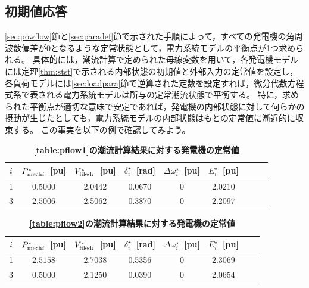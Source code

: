 \documentclass[tombow,dvipdfmx]{corona-a5-1.1}
\begin{document}
\subsection{初期値応答}

\ref{sec:powflow}節と\ref{sec:paradef}節で示された手順によって，すべての発電機の角周波数偏差が0となるような定常状態として，電力系統モデルの平衡点が1つ求められる。
具体的には，潮流計算で定められた母線変数を用いて，各発電機モデルには定理\ref{thm:stst}で示される内部状態の初期値と外部入力の定常値を設定し，各負荷モデルには\ref{sec:loadpara}節で逆算された定数を設定すれば，微分代数方程式系で表される電力系統モデルは所与の定常潮流状態で平衡する。
特に，求められた平衡点が適切な意味で安定であれば，発電機の内部状態に対して何らかの摂動が生じたとしても，電力系統モデルの内部状態はもとの定常値に漸近的に収束する。
この事実を以下の例で確認してみよう。


\begin{table}[h]
\medskip
 \caption{\textbf{\ref{table:pflow1}の潮流計算結果に対する発電機の定常値}}
 \label{table:genst13a}
 \centering
  \begin{tabular}{ccccccccc}
   \hline
$i$ &  $P_{{\rm mech}i}^{\star}$~[pu] & $V_{{\rm filed}i}^{\star}$~[pu] & $\delta_i^{\star}$~[rad] & $\Delta \omega_i^{\star}$~[pu] & $E_i^{\star}$~[pu] \\
   \hline \hline
1 & $0.5000$ & 2.0442 & 0.0670 & 0 & 2.0210 \\
3 & $2.5006$ & 2.5062 & 0.3870 & 0 & 2.2097 \\
   \hline
  \end{tabular}
\end{table}

\begin{table}[h]
\medskip
 \caption{\textbf{\ref{table:pflow2}の潮流計算結果に対する発電機の定常値}}
 \label{table:genst13b}
 \centering
  \begin{tabular}{cccccccc}
   \hline
$i$ &  $P_{{\rm mech}i}^{\star}$~[pu] & $V_{{\rm filed}i}^{\star}$~[pu] & $\delta_i^{\star}$~[rad] & $\Delta \omega_i^{\star}$~[pu] & $E_i^{\star}$~[pu] \\
   \hline \hline
1 & $2.5158$ & 2.7038 & 0.5356 & 0 & 2.3069 \\
3 & $0.5000$ & 2.1250 & 0.0390 & 0 & 2.0654 \\
   \hline
  \end{tabular}
\end{table}
\end{document}

